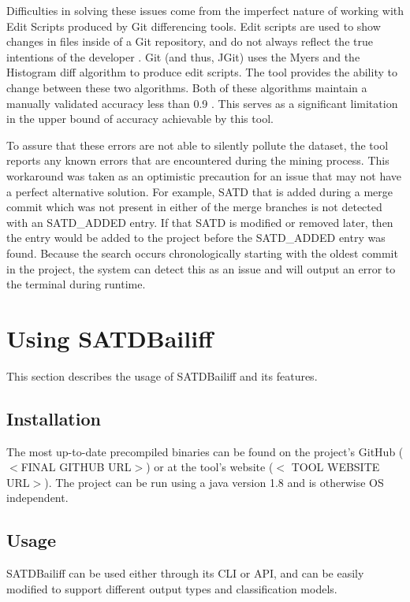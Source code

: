\documentclass[conference]{IEEEtran}
\begin{document}
Difficulties in solving these issues come from the imperfect nature of working with Edit Scripts produced by Git differencing tools. Edit scripts are used to show changes in files inside of a Git repository, and do not always reflect the true intentions of the developer \cite{Frick}. Git (and thus, JGit) uses the Myers \cite{Myers} and the Histogram diff algorithm to produce edit scripts. The tool provides the ability to change between these two algorithms. Both of these algorithms maintain a manually validated accuracy less than 0.9 \cite{Frick}. This serves as a significant limitation in the upper bound of accuracy achievable by this tool.

To assure that these errors are not able to silently pollute the dataset, the tool reports any known errors that are encountered during the mining process.
This workaround was taken as an optimistic precaution for an issue that may not have a perfect alternative solution.
For example, SATD that is added during a merge commit which was not present in either of the merge branches is not detected with an SATD\_ADDED entry. If that SATD is modified or removed later, then the entry would be added to the project before the SATD\_ADDED entry was found. Because the search occurs chronologically starting with the oldest commit in the project, the system can detect this as an issue and will output an error to the terminal during runtime.

\section{Using SATDBailiff}

This section describes the usage of SATDBailiff and its features.
\subsection{Installation}
The most up-to-date precompiled binaries can be found on the project's GitHub ( $<$FINAL GITHUB URL$>$) or at the tool's website ($<$ TOOL WEBSITE URL$>$). The project can be run using a java version 1.8 and is otherwise OS independent.
\subsection{Usage}
SATDBailiff can be used either through its CLI or API, and can be easily modified to support different output types and classification models.
\end{document}
